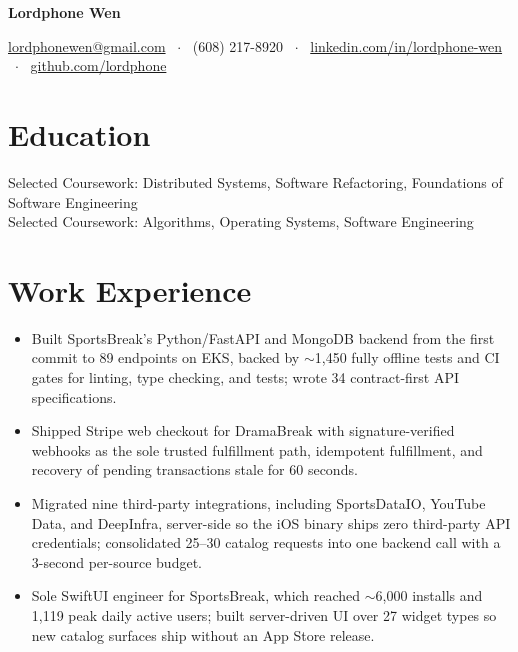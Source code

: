 \documentclass[11pt, letterpaper]{article}
\begin{document}
\noindent
{\LARGE\bfseries Lordphone Wen}%
\hfill
{}\\[5pt]
{\centering
  \href{mailto:lordphonewen@gmail.com}{lordphonewen@gmail.com} \ $\cdot$ \
  (608) 217-8920 \ $\cdot$ \
  \href{https://www.linkedin.com/in/lordphone-wen}{linkedin.com/in/lordphone-wen} \ $\cdot$ \
  \href{https://github.com/lordphone}{github.com/lordphone}\par
}

\section{Education}
Selected Coursework: Distributed Systems, Software Refactoring, Foundations of Software Engineering\\[1pt]
Selected Coursework: Algorithms, Operating Systems, Software Engineering

\section{Work Experience}
\begin{itemize}
  \item Built SportsBreak's Python/FastAPI and MongoDB backend from the first commit to 89 endpoints on EKS, backed by $\sim$1{,}450 fully offline tests and CI gates for linting, type checking, and tests; wrote 34 contract-first API specifications.
  \item Shipped Stripe web checkout for DramaBreak with signature-verified webhooks as the sole trusted fulfillment path, idempotent fulfillment, and recovery of pending transactions stale for 60 seconds.
  \item Migrated nine third-party integrations, including SportsDataIO, YouTube Data, and DeepInfra, server-side so the iOS binary ships zero third-party API credentials; consolidated 25--30 catalog requests into one backend call with a 3-second per-source budget.
  \item Sole SwiftUI engineer for SportsBreak, which reached $\sim$6{,}000 installs and 1{,}119 peak daily active users; built server-driven UI over 27 widget types so new catalog surfaces ship without an App Store release.
\end{itemize}
\end{document}

